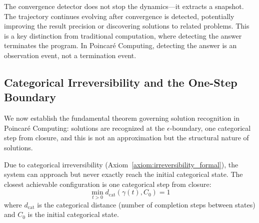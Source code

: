 \begin{remark}
\label{rem:non_halting_convergence}
The convergence detector does not stop the dynamics---it extracts a snapshot. The trajectory continues evolving after convergence is detected, potentially improving the result precision or discovering solutions to related problems. This is a key distinction from traditional computation, where detecting the answer terminates the program. In Poincaré Computing, detecting the answer is an observation event, not a termination event.
\end{remark}

\subsection{Categorical Irreversibility and the One-Step Boundary}

We now establish the fundamental theorem governing solution recognition in Poincaré Computing: solutions are recognized at the $\epsilon$-boundary, one categorical step from closure, and this is not an approximation but the structural nature of solutions.

\begin{theorem}
\label{thm:asymptotic_solution}
Due to categorical irreversibility (Axiom~\ref{axiom:irreversibility_formal}), the system can approach but never exactly reach the initial categorical state. The closest achievable configuration is one categorical step from closure:
\begin{equation}
\min_{t > 0} d_{\text{cat}}(\gamma(t), C_0) = 1
\end{equation}
where $d_{\text{cat}}$ is the categorical distance (number of completion steps between states) and $C_0$ is the initial categorical state.
\end{theorem}

